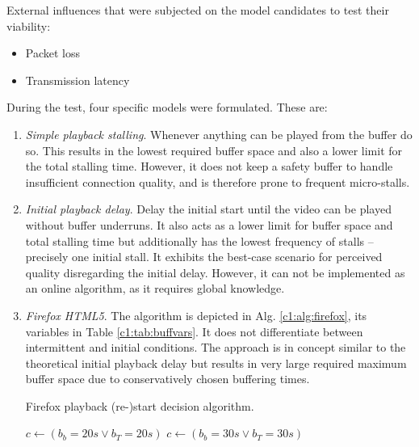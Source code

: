 External influences that were subjected on the model candidates to test their viability:

\begin{itemize}
\item Packet loss
\item Transmission latency
\end{itemize}

During the test, four specific models were formulated. These are:

\begin{enumerate}
\item \textit{Simple playback stalling}. Whenever anything can be played from the buffer do so. This results in the lowest required buffer space and also a lower limit for the total stalling time. However, it does not keep a safety buffer to handle insufficient connection quality, and is therefore prone to frequent micro-stalls.


\item \textit{Initial playback delay}. Delay the initial start until the video can be played without buffer underruns. It also acts as a lower limit for buffer space and total stalling time but additionally has the lowest frequency of stalls -- precisely one initial stall. It exhibits the best-case scenario for perceived quality disregarding the initial delay. However, it can not be implemented as an online algorithm, as it requires global knowledge.


\item \textit{Firefox HTML5}. The algorithm is depicted in Alg. \ref{c1:alg:firefox}, its variables in Table \ref{c1:tab:buffvars}. It does not differentiate between intermittent and initial conditions. The approach is in concept similar to the theoretical initial playback delay but results in very large required maximum buffer space due to conservatively chosen buffering times.

\begin{algorithm}
    \centering
    \caption{Firefox playback (re-)start decision algorithm.}
    \label{c1:alg:firefox}
    \begin{algorithmic}
          \STATE $c \gets ( b_b=20s \lor b_T=20s )$
        \ELSE
          \STATE $c \gets ( b_b=30s \lor b_T=30s )$
        \ENDIF 
    \end{algorithmic}
\end{algorithm}


\end{enumerate}
